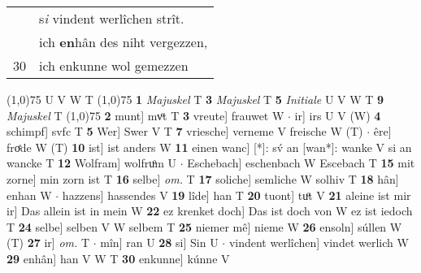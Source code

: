 \documentclass[8pt,a4paper,notitlepage]{article}
\begin{document}
\begin{table}[ht]
\begin{minipage}[t]{0.5\linewidth}
\begin{tabular}{rl}
 & s\textit{i} vindent werlîchen strît.\\ 
 & ich \textbf{en}hân des niht vergezzen,\\ 
30 & ich enkunne wol gemezzen\\ 
\end{tabular}
\scriptsize
\line(1,0){75} \newline
U V W T \newline
\line(1,0){75} \newline
\textbf{1} \textit{Majuskel} T  \textbf{3} \textit{Majuskel} T  \textbf{5} \textit{Initiale} U V W T  \textbf{9} \textit{Majuskel} T  \newline
\line(1,0){75} \newline
\textbf{2} munt] mvͦt T \textbf{3} vreute] frauwet W  $\cdot$ ir] irs U V (W) \textbf{4} schimpf] svfc T \textbf{5} Wer] Swer V T \textbf{7} vriesche] verneme V freische W (T)  $\cdot$ êre] froͤde W (T) \textbf{10} ist] ist anders W \textbf{11} einen wanc] [*]: sv́ an [wan*]: wanke V si an wancke T \textbf{12} Wolfram] wolfruͦm U  $\cdot$ Eschebach] eschenbach W Escebach T \textbf{15} mit zorne] min zorn ist T \textbf{16} selbe] \textit{om.} T \textbf{17} soliche] semliche W solhiv T \textbf{18} hân] enhan W  $\cdot$ hazzens] hassendes V \textbf{19} lîde] han T \textbf{20} tuont] tuͦt V \textbf{21} aleine ist mir ir] Das allein ist in mein W \textbf{22} ez krenket doch] Das ist doch von W ez ist iedoch T \textbf{24} selbe] selben V W selbem T \textbf{25} niemer mê] nieme W \textbf{26} ensoln] súllen W (T) \textbf{27} ir] \textit{om.} T  $\cdot$ mîn] ran U \textbf{28} si] Sin U  $\cdot$ vindent werlîchen] vindet werlich W \textbf{29} enhân] han V W T \textbf{30} enkunne] kúnne V \newline
\end{minipage}
\end{table}
\end{document}

